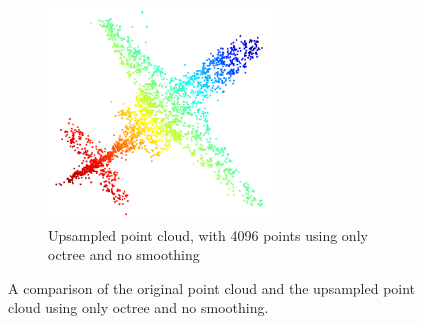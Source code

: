 \begin{figure}[!ht]
\begin{subfigure}{0.3\textwidth}
		\includegraphics[width=0.65\textwidth]{./4096_octree_no_smoothing.png}
		\caption{Upsampled point cloud, with 4096 points using only octree and no smoothing}
	\end{subfigure}	
	\caption{A comparison of the original point cloud and the upsampled point cloud using only octree and no smoothing.}
	\label{fig:no_smoothing}
\end{figure}

